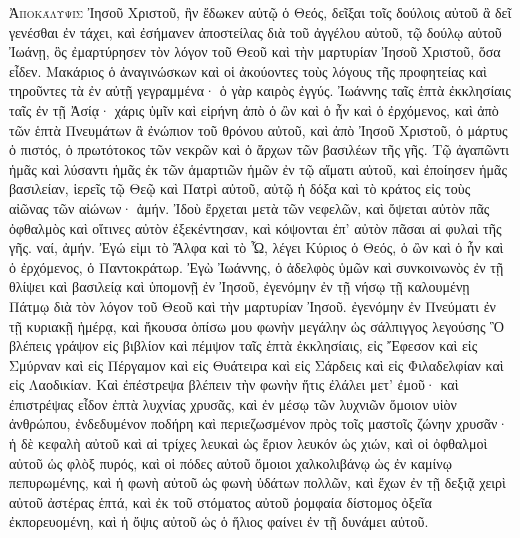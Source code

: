 \begin{pages}
    \begin{Rightside}
        \beginnumbering
		\renewcommand{\LettrineFontHook}{\PHtitl}
		\lettrine[lines=3]{Ἀ}{ποκάλυψις} Ἰησοῦ Χριστοῦ, ἣν ἔδωκεν αὐτῷ ὁ Θεός, δεῖξαι τοῖς δούλοις αὐτοῦ ἃ δεῖ γενέσθαι ἐν τάχει, καὶ ἐσήμανεν ἀποστείλας διὰ τοῦ ἀγγέλου αὐτοῦ, τῷ δούλῳ αὐτοῦ Ἰωάνῃ, ὃς ἐμαρτύρησεν τὸν λόγον τοῦ Θεοῦ καὶ τὴν μαρτυρίαν Ἰησοῦ Χριστοῦ, ὅσα εἶδεν. Μακάριος ὁ ἀναγινώσκων καὶ οἱ ἀκούοντες τοὺς λόγους τῆς προφητείας καὶ τηροῦντες τὰ ἐν αὐτῇ γεγραμμένα· ὁ γὰρ καιρὸς ἐγγύς.
		\pend
		\pstart
			Ἰωάννης ταῖς ἑπτὰ ἐκκλησίαις ταῖς ἐν τῇ Ἀσίᾳ· χάρις ὑμῖν καὶ εἰρήνη ἀπὸ ὁ ὢν καὶ ὁ ἦν καὶ ὁ ἐρχόμενος, καὶ ἀπὸ τῶν ἑπτὰ Πνευμάτων ἃ ἐνώπιον τοῦ θρόνου αὐτοῦ, καὶ ἀπὸ Ἰησοῦ Χριστοῦ, ὁ μάρτυς ὁ πιστός, ὁ πρωτότοκος τῶν νεκρῶν καὶ ὁ ἄρχων τῶν βασιλέων τῆς γῆς.
		\pend
		\pstart
			Τῷ ἀγαπῶντι ἡμᾶς καὶ λύσαντι ἡμᾶς ἐκ τῶν ἁμαρτιῶν ἡμῶν ἐν τῷ αἵματι αὐτοῦ, καὶ ἐποίησεν ἡμᾶς βασιλείαν, ἱερεῖς τῷ Θεῷ καὶ Πατρὶ αὐτοῦ, αὐτῷ ἡ δόξα καὶ τὸ κράτος εἰς τοὺς αἰῶνας τῶν αἰώνων· ἀμήν.
		\pend
		\pstart	
			Ἰδοὺ ἔρχεται μετὰ τῶν νεφελῶν, καὶ ὄψεται αὐτὸν πᾶς ὀφθαλμὸς καὶ οἵτινες αὐτὸν ἐξεκέντησαν, καὶ κόψονται ἐπ’ αὐτὸν πᾶσαι αἱ φυλαὶ τῆς γῆς. ναί, ἀμήν.
		\pend
		\pstart
			Ἐγώ εἰμι τὸ Ἄλφα καὶ τὸ Ὦ, λέγει Κύριος ὁ Θεός, ὁ ὢν καὶ ὁ ἦν καὶ ὁ ἐρχόμενος, ὁ Παντοκράτωρ.		
			\pend
		\pstart
			Ἐγὼ Ἰωάννης, ὁ ἀδελφὸς ὑμῶν καὶ συνκοινωνὸς ἐν τῇ θλίψει καὶ βασιλείᾳ καὶ ὑπομονῇ ἐν Ἰησοῦ, ἐγενόμην ἐν τῇ νήσῳ τῇ καλουμένῃ Πάτμῳ διὰ τὸν λόγον τοῦ Θεοῦ καὶ τὴν μαρτυρίαν Ἰησοῦ. ἐγενόμην ἐν Πνεύματι ἐν τῇ κυριακῇ ἡμέρᾳ, καὶ ἤκουσα ὀπίσω μου φωνὴν μεγάλην ὡς σάλπιγγος λεγούσης Ὃ βλέπεις γράψον εἰς βιβλίον καὶ πέμψον ταῖς ἑπτὰ ἐκκλησίαις, εἰς Ἔφεσον καὶ εἰς Σμύρναν καὶ εἰς Πέργαμον καὶ εἰς Θυάτειρα καὶ εἰς Σάρδεις καὶ εἰς Φιλαδελφίαν καὶ εἰς Λαοδικίαν. 
		\pend
		\pstart
			Καὶ ἐπέστρεψα βλέπειν τὴν φωνὴν ἥτις ἐλάλει μετ’ ἐμοῦ· καὶ ἐπιστρέψας εἶδον ἑπτὰ λυχνίας χρυσᾶς, καὶ ἐν μέσῳ τῶν λυχνιῶν ὅμοιον υἱὸν ἀνθρώπου, ἐνδεδυμένον ποδήρη καὶ περιεζωσμένον πρὸς τοῖς μαστοῖς ζώνην χρυσᾶν· ἡ δὲ κεφαλὴ αὐτοῦ καὶ αἱ τρίχες λευκαὶ ὡς ἔριον λευκόν ὡς χιών, καὶ οἱ ὀφθαλμοὶ αὐτοῦ ὡς φλὸξ πυρός, καὶ οἱ πόδες αὐτοῦ ὅμοιοι χαλκολιβάνῳ ὡς ἐν καμίνῳ πεπυρωμένης, καὶ ἡ φωνὴ αὐτοῦ ὡς φωνὴ ὑδάτων πολλῶν, καὶ ἔχων ἐν τῇ δεξιᾷ χειρὶ αὐτοῦ ἀστέρας ἑπτά, καὶ ἐκ τοῦ στόματος αὐτοῦ ῥομφαία δίστομος ὀξεῖα ἐκπορευομένη, καὶ ἡ ὄψις αὐτοῦ ὡς ὁ ἥλιος φαίνει ἐν τῇ δυνάμει αὐτοῦ. 

\end{Rightside}
\end{pages}
